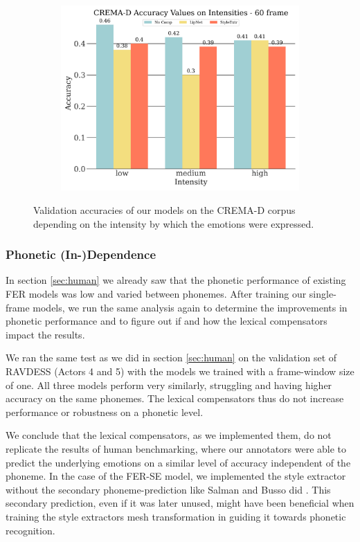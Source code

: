 \begin{figure}[!htb]
\begin{subfigure}[b]{0.45\textwidth}
      \includegraphics[width=\textwidth]{res/crema-intensities-60.png}
    \end{subfigure}
    \caption{Validation accuracies of our models on the CREMA-D corpus depending on the intensity by which the emotions were expressed.}
    \label{fig:crema_intesities}
\end{figure}

\subsubsection{Phonetic (In-)Dependence}
In section \ref{sec:human} we already saw that the phonetic performance of existing FER models was low and varied between phonemes. After training our single-frame models, we run the same analysis again to determine the improvements in phonetic performance and to figure out if and how the lexical compensators impact the results.

We ran the same test as we did in section \ref{sec:human} on the validation set of RAVDESS (Actors 4 and 5) with the models we trained with a frame-window size of one. All three models perform very similarly, struggling and having higher accuracy on the same phonemes. The lexical compensators thus do not increase performance or robustness on a phonetic level.

We conclude that the lexical compensators, as we implemented them, do not replicate the results of human benchmarking, where our annotators were able to predict the underlying emotions on a similar level of accuracy independent of the phoneme. In the case of the FER-SE model, we implemented the style extractor without the secondary phoneme-prediction like Salman and Busso did \cite{salman2020style}. This secondary prediction, even if it was later unused, might have been beneficial when training the style extractors mesh transformation in guiding it towards phonetic recognition.


